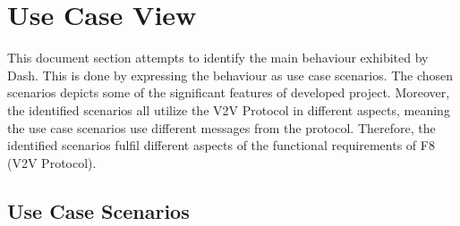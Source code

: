 \documentclass[12pt]{article}
\begin{document}
\section{Use Case View}
This document section attempts to identify the main behaviour exhibited by Dash. This is done by expressing the behaviour as use case scenarios. The chosen scenarios depicts some of the significant features of developed project. Moreover, the identified scenarios all utilize the V2V Protocol in different aspects, meaning the use case scenarios use different messages from the protocol. Therefore, the identified scenarios fulfil different aspects of the functional requirements of F8 (V2V Protocol).\par

\subsection{Use Case Scenarios}

\end{document}
